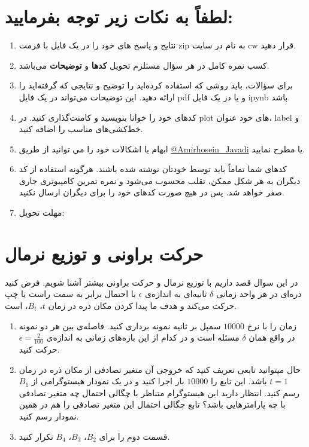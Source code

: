\documentclass[a4paper]{article}
\begin{document}
\section*{
لطفاً به نکات زیر توجه بفرمایید:
}
\begin{enumerate}
	\item 
نتایج و پاسخ های خود را در یک فایل با فرمت zip به نام
 در سایت  cw قرار دهید.
	\item 
کسب نمره کامل در هر سؤال مستلزم تحویل  \textbf{کدها} و \textbf{توضیحات} می‌باشد. 
\item 
برای سؤالات، باید روشی که استفاده کرده‌اید را توضیح  و نتایجی که گرفته‌اید را ارائه دهید. این توضیحات می‌تواند در یک فایل  pdf  و یا در یک فایل  ipynb باشد. 
\item 
کدهای خود را خوانا بنویسید و کامنت‌‌گذاری کنید. در plot های خود عنوان، label و خط‌کشی‌های مناسب را اضافه کنید.
\item
ابهام يا اشكالات خود را مي توانيد  از طریق
\href{https://t.me/Amirhosein_javadi}{@Amirhosein\_Javadi}
یا 
\href{mailto:javadiamirhosein.2000@gmail.com}{}
مطرح نماييد.
\item 
کدهای شما تماماً باید توسط خودتان نوشته شده باشند. هرگونه استفاده از کد دیگران به هر شکل ممکن، تقلب محسوب می‌شود و نمره تمرین کامپیوتری جاری صفر خواهد شد. پس در هیچ صورت کدهای خود را برای دیگران ارسال نکنید.

\item 
مهلت تحویل:  
\end{enumerate}
\clearpage
\section{
حرکت براونی و توزیع نرمال
}
در این سوال قصد داریم با توزیع نرمال و حرکت براونی بیشتر آشنا شویم.
فرض کنید ذره‌ای در هر واحد زمانی
$ \delta $ 
ثانیه‌ای به اندازه‌ی 
$ \epsilon $
با احتمال برابر به سمت راست یا چپ حرکت می‌کند و هدف ما پیدا کردن مکان ذره در زمان $ t $،
$ B_{t} $، 
است. 
\begin{enumerate}
	\item
زمان را با نرخ $ 10000 $ سمپل بر ثانیه نمونه برداری کنید. فاصله‌ی بین هر دو نمونه در واقع همان $ \delta $ مسئله است و در کدام از این بازه‌های زمانی‌ به اندازه‌ی 
$ \epsilon = \frac{2}{100} $ 
حرکت کنید. 
	\item
حال میتوانید تابعی تعریف کنید که خروجی آن متغیر تصادفی از مکان ذره در زمان 
$ t = 1 $
باشد. 
این تابع را 
$ 10000 $
بار اجرا کنید و در یک نمودار هیستوگرامی از 
$ B_{1} $
رسم کنید. انتظار دارید این هیستوگرام متناظر با چگالی احتمال چه متغیر تصادفی با چه پارامترهایی باشد؟ تابع چگالی احتمال این متغیر تصادفی را هم در همین نمودار رسم کنید.
	\item
	قسمت دوم را برای 
$ B_{2} $،	
$ B_{3} $،
$ B_{4} $
تکرار کنید.
	
\end{enumerate}	
\end{document}
